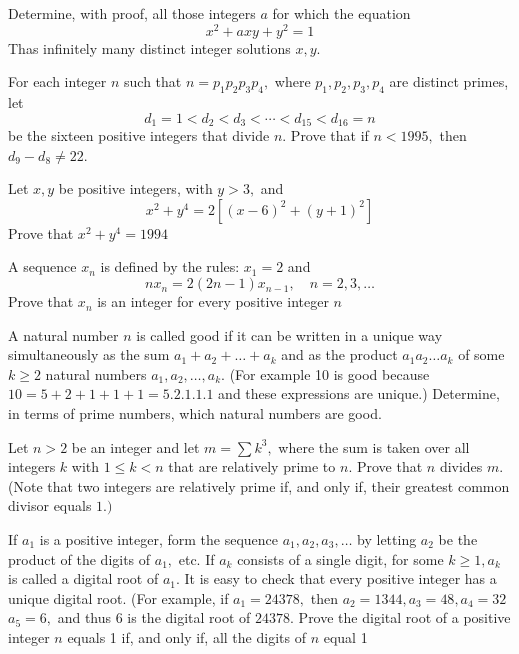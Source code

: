\documentclass{pset}
\begin{document}
\begin{problems}
\begin{problem}[IrMO 1995 Q2]
    Determine, with proof, all those integers \(a\) for which the equation
    $$
    x^{2}+a x y+y^{2}=1
    $$
    Thas infinitely many distinct integer solutions \(x, y .\)
\end{problem}

\begin{problem}[IrMO 1995 Q10]
    For each integer \(n\) such that \(n=p_{1} p_{2} p_{3} p_{4},\) where \(p_{1}, p_{2}, p_{3}, p_{4}\) are distinct primes, let
    $$
    d_{1}=1<d_{2}<d_{3}<\cdots<d_{15}<d_{16}=n
    $$
    be the sixteen positive integers that divide \(n .\) Prove that if \(n<1995,\) then \(d_{9}-d_{8} \neq 22\).
\end{problem}

\begin{problem}[IrMO 1994 Q1]
    Let \(x, y\) be positive integers, with \(y>3,\) and
    $$
    x^{2}+y^{4}=2\left[(x-6)^{2}+(y+1)^{2}\right]
    $$
    Prove that \(x^{2}+y^{4}=1994\)
\end{problem}

\begin{problem}[IrMO 1994 Q6]
    A sequence \(x_{n}\) is defined by the rules: \(x_{1}=2\) and
    $$
    n x_{n}=2(2 n-1) x_{n-1}, \quad n=2,3, \ldots
    $$
    Prove that \(x_{n}\) is an integer for every positive integer \(n\)
\end{problem}

\begin{problem}[IrMO 1993 Q2]
    A natural number \(n\) is called good if it can be written in a unique way simultaneously as the sum \(a_{1}+a_{2}+\ldots+a_{k}\) and as the product \(a_{1} a_{2} \ldots a_{k}\) of some \(k \geq 2\) natural numbers \(a_{1}, a_{2}, \ldots, a_{k} .\) (For example 10 is good because \(10=5+2+1+1+1=5.2 .1 .1 .1\) and these expressions are unique.) Determine, in terms of prime numbers, which natural numbers are good.
\end{problem}

\begin{problem}[IrMO 1992 Q6]
    Let \(n>2\) be an integer and let \(m=\sum k^{3},\) where the sum is taken over all integers
    \(k\) with \(1 \leq k<n\) that are relatively prime to \(n .\) Prove that \(n\) divides \(m .\) (Note that two integers are relatively prime if, and only if, their greatest common divisor equals \(1 .)\)
\end{problem}

\begin{problem}[IrMO 1992 Q7]
    If \(a_{1}\) is a positive integer, form the sequence \(a_{1}, a_{2}, a_{3}, \ldots\) by letting \(a_{2}\) be the product of the digits of \(a_{1},\) etc. If \(a_{k}\) consists of a single digit, for some \(k \geq 1, a_{k}\) is called a digital root of \(a_{1} .\) It is easy to check that every positive integer has a unique digital root. (For example, if \(a_{1}=24378,\) then \(a_{2}=1344, a_{3}=48, a_{4}=32\) \(a_{5}=6,\) and thus 6 is the digital root of \(24378 .\) Prove the digital root of a positive integer \(n\) equals 1 if, and only if, all the digits of \(n\) equal 1
\end{problem}


\end{problems}
\end{document}
